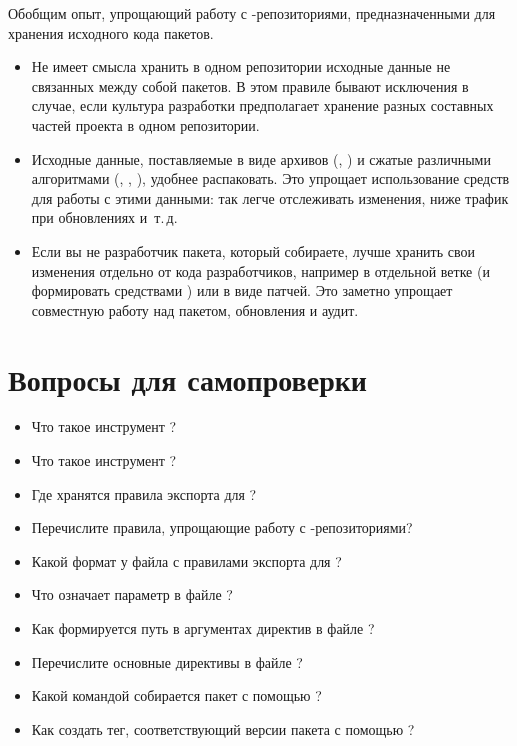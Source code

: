 Обобщим опыт, упрощающий работу с -репозиториями, предназначенными для хранения исходного кода пакетов.

\begin{itemize}
	\item {}

	Не имеет смысла хранить в одном репозитории исходные данные не связанных между собой пакетов.
		В этом правиле бывают исключения в случае, если культура разработки предполагает хранение
		разных составных частей проекта в одном репозитории.
	\item  {}

	Исходные данные, поставляемые в виде архивов (, ) и сжатые различными
		алгоритмами (, , ), удобнее распаковать. Это упрощает
		использование средств  для работы с этими данными: так легче отслеживать изменения,
		ниже трафик при обновлениях и~т.\,д.
	\item {}

	Если вы не разработчик пакета, который собираете, лучше хранить свои изменения отдельно
		от кода разработчиков, например в отдельной ветке (и формировать  средствами )
		или в виде патчей. Это заметно упрощает совместную работу над пакетом, обновления и аудит.
\end{itemize}
\section{Вопросы для самопроверки}

\begin{itemize}
	\item Что такое инструмент ?
	\item Что такое инструмент ?
	\item Где хранятся правила экспорта для ?
	\item Перечислите правила, упрощающие работу с -репозиториями?
	\item Какой формат у файла с правилами экспорта для ?
	\item Что означает параметр  в файле ?
	\item Как формируется путь в аргументах директив в файле ?
	\item Перечислите основные директивы в файле ?
	\item Какой командой собирается пакет с помощью ?
	\item Как создать тег, соответствующий версии пакета с помощью ?
\end{itemize}
